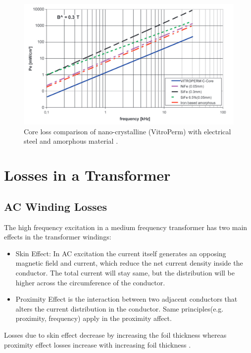 \documentclass[a4paper, 11pt]{article} %
\begin{document}
\begin{figure}[]
  \centering
    \includegraphics[scale=0.3]{vitroperm_core_losses_vs_freq}
  \caption{Core loss comparison of nano-crystalline (VitroPerm) with electrical steel and amorphous material \cite{vitroterm_manual}.}
  \label{core-loss-log}
\end{figure}

\section{Losses in a Transformer}

\subsection{AC Winding Losses}

The high frequency excitation in a medium frequency transformer has two main effects in the transformer windings:
\begin{itemize}
  \item Skin Effect: In AC excitation the current itself generates an opposing magnetic field and current, which reduce the net current density inside the conductor. The total current will stay same, but the distribution will be higher across the circumference of the conductor.
  \item Proximity Effect is the interaction between two adjacent conductors that alters the current distribution in the conductor. Same principles(e.g. proximity, frequency) apply in the proximity affect.
\end{itemize}

Losses due to skin effect decrease by increasing the foil thickness whereas proximity effect losses increase with increasing foil thickness \cite{Ortiz2010}.
\end{document}
